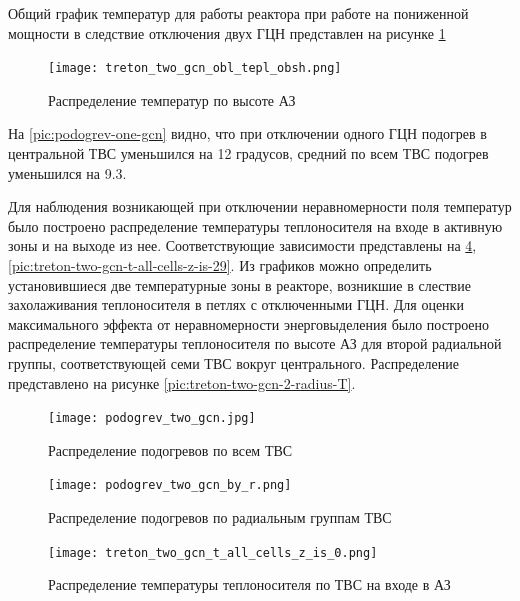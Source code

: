 Общий график температур для работы реактора при работе на пониженной мощности в следствие отключения двух ГЦН представлен на рисунке \ref{pic:treton-two-gcn-obl-tepl-obsh}

\begin{figure}[H]
	\begin{center}
		\texttt{[image: treton\_two\_gcn\_obl\_tepl\_obsh.png]}
		\caption{Распределение температур по высоте АЗ}
		\label{pic:treton-two-gcn-obl-tepl-obsh} %
	\end{center}
\end{figure}
На \ref{pic:podogrev-one-gcn} видно, что при отключении одного ГЦН подогрев в центральной ТВС уменьшился на 12 градусов, средний по всем ТВС подогрев уменьшился на 9.3. 

Для наблюдения возникающей при отключении неравномерности поля температур было построено распределение температуры теплоносителя на входе в активную зоны и на выходе из нее. Соответствующие зависимости представлены на \ref{pic:treton-two-gcn-t-all-cells-z-is-0}, \ref{pic:treton-two-gcn-t-all-cells-z-is-29}. Из графиков можно определить установившиеся две температурные зоны в реакторе, возникшие в слествие захолаживания теплоносителя в петлях с отключенными ГЦН. Для оценки максимального эффекта от неравномерности энерговыделения было построено распределение температуры теплоносителя по высоте АЗ для второй радиальной группы, соответствующей семи ТВС вокруг центрального. Распределение представлено на рисунке \ref{pic:treton-two-gcn-2-radius-T}.

\begin{figure}[H]
	\begin{center}
		\texttt{[image: podogrev\_two\_gcn.jpg]}
		\caption{Распределение подогревов по всем ТВС}
		\label{pic:podogrev-two-gcn} %
	\end{center}
\end{figure}

\begin{figure}[H]
	\begin{center}
		\texttt{[image: podogrev\_two\_gcn\_by\_r.png]}
		\caption{Распределение подогревов по радиальным группам ТВС}
		\label{pic:podogrev-two-gcn-by-r} %
	\end{center}
\end{figure}

\begin{figure}[H]
	\begin{center}
		\texttt{[image: treton\_two\_gcn\_t\_all\_cells\_z\_is\_0.png]}
		\caption{Распределение температуры теплоносителя по ТВС на входе в АЗ}
		\label{pic:treton-two-gcn-t-all-cells-z-is-0} %
	\end{center}
\end{figure}


